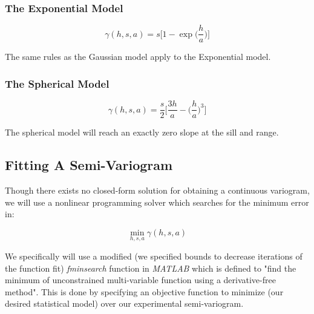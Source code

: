 \documentclass[11pt]{ucthesis}
\begin{document}
\subsubsection{The Exponential Model}

\begin{equation}
	\gamma(h, s, a) = s \Bigg[ 1 - \exp \Bigg( \dfrac{h}{a} \Bigg) \Bigg]
	\label{eq:exp_model}
\end{equation}

The same rules as the Gaussian model apply to the Exponential model.

\subsubsection{The Spherical Model}

\begin{equation}
	\gamma(h, s, a) = \frac{s}{2} \Bigg[ \dfrac{3h}{a} - \Bigg( \dfrac{h}{a} \Bigg)^3 \Bigg]
	\label{eq:sph_model}
\end{equation}

The spherical model will reach an exactly zero slope at the sill and range.

\subsection{Fitting A Semi-Variogram}

Though there exists no closed-form solution for obtaining a continuous variogram, we will use a nonlinear programming solver which searches for the minimum error in:

\begin{equation}
\min\limits_{h, s, a}\gamma(h, s, a)
\end{equation}

We specifically will use a modified (we specified bounds to decrease iterations of the function fit) \textit{fminsearch} function in \textit{MATLAB} which is defined to "find the minimum of unconstrained multi-variable function using a derivative-free method". This is done by specifying an objective function to minimize (our desired statistical model) over our experimental semi-variogram.
\end{document}
